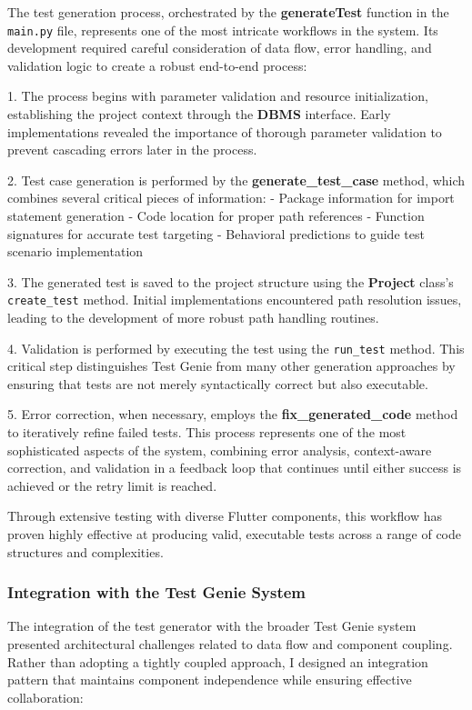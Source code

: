 The test generation process, orchestrated by the \textbf{generateTest} function in the \texttt{main.py} file, represents one of the most intricate workflows in the system. Its development required careful consideration of data flow, error handling, and validation logic to create a robust end-to-end process:

1. The process begins with parameter validation and resource initialization, establishing the project context through the \textbf{DBMS} interface. Early implementations revealed the importance of thorough parameter validation to prevent cascading errors later in the process.

2. Test case generation is performed by the \textbf{generate\_test\_case} method, which combines several critical pieces of information:
   - Package information for import statement generation
   - Code location for proper path references
   - Function signatures for accurate test targeting
   - Behavioral predictions to guide test scenario implementation

3. The generated test is saved to the project structure using the \textbf{Project} class's \texttt{create\_test} method. Initial implementations encountered path resolution issues, leading to the development of more robust path handling routines.

4. Validation is performed by executing the test using the \texttt{run\_test} method. This critical step distinguishes Test Genie from many other generation approaches by ensuring that tests are not merely syntactically correct but also executable.

5. Error correction, when necessary, employs the \textbf{fix\_generated\_code} method to iteratively refine failed tests. This process represents one of the most sophisticated aspects of the system, combining error analysis, context-aware correction, and validation in a feedback loop that continues until either success is achieved or the retry limit is reached.

Through extensive testing with diverse Flutter components, this workflow has proven highly effective at producing valid, executable tests across a range of code structures and complexities.

\subsubsection{Integration with the Test Genie System}

The integration of the test generator with the broader Test Genie system presented architectural challenges related to data flow and component coupling. Rather than adopting a tightly coupled approach, I designed an integration pattern that maintains component independence while ensuring effective collaboration:

